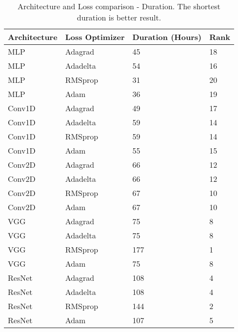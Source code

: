 \begin{table*}[!ht]
    \footnotesize
    \centering
    \begin{tabular}{@{}llll@{}}\toprule
            Architecture & Loss Optimizer & Duration (Hours) & Rank         \\ \hline
            MLP          & Adagrad        & 45               & 18            \\
            MLP          & Adadelta       & 54               & 16            \\
            MLP          & RMSprop        & 31               & 20            \\
            MLP          & Adam           & 36               & 19            \\
            Conv1D       & Adagrad        & 49               & 17            \\
            Conv1D       & Adadelta       & 59               & 14            \\
            Conv1D       & RMSprop        & 59               & 14            \\
            Conv1D       & Adam           & 55               & 15            \\
            Conv2D       & Adagrad        & 66               & 12            \\
            Conv2D       & Adadelta       & 66               & 12            \\
            Conv2D       & RMSprop        & 67               & 10            \\
            Conv2D       & Adam           & 67               & 10            \\
            VGG          & Adagrad        & 75               & 8             \\
            VGG          & Adadelta       & 75               & 8             \\
            VGG          & RMSprop        & 177              & 1             \\
            VGG          & Adam           & 75               & 8             \\
            ResNet       & Adagrad        & 108              & 4             \\
            ResNet       & Adadelta       & 108              & 4             \\
            ResNet       & RMSprop        & 144              & 2             \\
            ResNet       & Adam           & 107              & 5             \\ \hline
    \end{tabular}
    \caption[Architecture and Loss comparison - Duration]{Architecture and Loss comparison - Duration. The shortest duration is better result.}
    \label{tab:app_res1_duration}
\end{table*}

